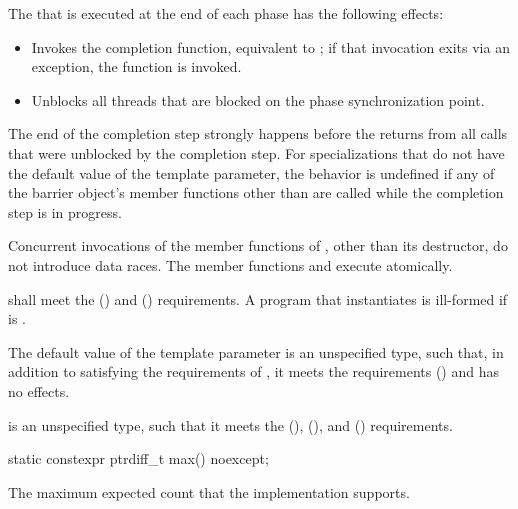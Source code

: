 \pnum
The 
that is executed at the end of each phase has the following effects:
\begin{itemize}
\item Invokes the completion function, equivalent to ;
if that invocation exits via an exception,
the function  is invoked.
\item Unblocks all threads that are blocked on the phase synchronization point.
\end{itemize}
The end of the completion step strongly happens before
the returns from all calls that were unblocked by the completion step.
For specializations that do not have
the default value of the  template parameter,
the behavior is undefined if any of the barrier object's member functions
other than  are called while the completion step is in progress.

\pnum
Concurrent invocations of the member functions of ,
other than its destructor, do not introduce data races.
The member functions  and 
execute atomically.

\pnum
{} shall meet the
 () and
 () requirements.
A program that instantiates
 is ill-formed if
 is .

\pnum
The default value of the  template parameter is
an unspecified type, such that,
in addition to satisfying the requirements of ,
it meets the 
requirements () and
 has no effects.

\pnum
{} is an unspecified type,
such that it meets the
 (),
 (), and
 () requirements.

%
\begin{itemdecl}
static constexpr ptrdiff_t max() noexcept;
\end{itemdecl}

\begin{itemdescr}
\pnum
\returns
The maximum expected count that the implementation supports.
\end{itemdescr}

